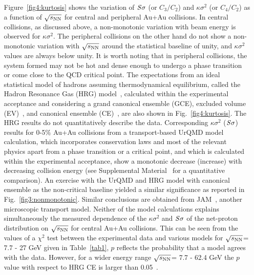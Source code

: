 \documentclass[10pt,aps,prc,twocolumn,floatfix]{revtex4-1}
\newcommand{\rootsnn} {\mbox{$\sqrt{s_{\rm NN}}$}\xspace}
\begin{document}
Figure~\ref{fig4:kurtosis} shows the variation of $\it{S}\sigma$
(or $C_{3}/C_{2}$) and  $\kappa\sigma^{2}$ (or
$C_{4}/C_{2}$) as a function of \rootsnn for central  
and peripheral Au+Au collisions. 
In central collisions, as discussed above, a non-monotonic variation with beam energy is
observed for $\kappa\sigma^2$.
The peripheral collisions on the other hand do not show a
non-monotonic variation with \rootsnn around the statistical baseline
of unity,  and $\kappa\sigma^2$ values are always below unity.
It is worth noting that in peripheral collisions, the 
system formed may not be hot and dense enough to undergo a phase
transition or come close to the QCD critical point.
The expectations from an ideal statistical model of hadrons assuming 
thermodynamical equilibrium, called the Hadron Resonance Gas (HRG) 
model~\cite{Garg:2013ata}, calculated within the experimental 
acceptance and considering a grand canonical ensemble (GCE), excluded
volume (EV)~\cite{Bhattacharyya:2013oya}, and canonical ensemble (CE)~\cite{Braun-Munzinger:2020jbk}, are also shown in 
Fig.~\ref{fig4:kurtosis}.
The HRG results do not quantitatively describe the data.
Corresponding $\kappa\sigma^{2}$ ($\it{S}\sigma$) results for 0-5\%
Au+Au collisions from a transport-based UrQMD model~\cite{Bleicher:1999xi} calculation, which 
incorporates conservation laws and most of the relevant physics apart 
from a phase transition or a critical point, and which is calculated 
within the experimental acceptance, show a monotonic decrease (increase) 
with decreasing collision energy (see Supplemental Material~\cite{sup} for a
quantitative comparison).
An exercise with the UrQMD and HRG model with canonical ensemble as
the non-critical baseline yielded a similar significance as 
reported in Fig.~\ref{fig3:nonmonotonic}.
Similar conclusions are obtained 
  from JAM~\cite{Zhang:2019lqz}, another microscopic transport model. 
Neither of the model calculations explains simultaneously the measured dependence of 
the $\kappa\sigma^{2}$ and $\it{S}\sigma$ of the net-proton distribution on \rootsnn for 
central Au+Au collisions. This can be seen from the values of a $\chi^2$ test between
the experimental data and various models for \rootsnn = 7.7 - 27 GeV
given in Table~\ref{tab1}, $p$ reflects the probability that a model
agrees with the data. However, for a wider energy range \rootsnn = 7.7
- 62.4 GeV the $p$ value with respect to HRG CE is larger than 0.05~\cite{Braun-Munzinger:2020jbk}.
\end{document}
